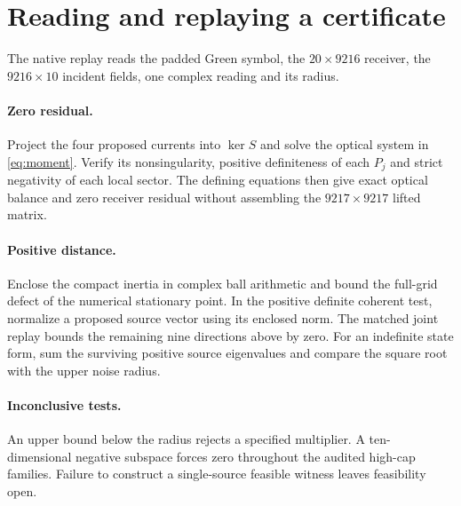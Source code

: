 \documentclass[anonymous,12pt]{iopjournal}
\theoremstyle{remark}\newtheorem{remark}[theorem]{Remark}
\numberwithin{equation}{section}
\begin{document}
\appendix
\section{Reading and replaying a certificate}\label{app:replay}

The native replay reads the padded Green symbol, the $20\times9216$ receiver, the $9216\times10$ incident fields, one complex reading and its radius.

\paragraph{Zero residual.}
Project the four proposed currents into $\ker S$ and solve the optical system in \eqref{eq:moment}. Verify its nonsingularity, positive definiteness of each $P_j$ and strict negativity of each local sector. The defining equations then give exact optical balance and zero receiver residual without assembling the $9217\times9217$ lifted matrix.

\paragraph{Positive distance.}
Enclose the compact inertia in complex ball arithmetic \cite{arb} and bound the full-grid defect of the numerical stationary point. In the positive definite coherent test, normalize a proposed source vector using its enclosed norm. The matched joint replay bounds the remaining nine directions above by zero. For an indefinite state form, sum the surviving positive source eigenvalues and compare the square root with the upper noise radius.

\paragraph{Inconclusive tests.}
An upper bound below the radius rejects a specified multiplier. A ten-dimensional negative subspace forces zero throughout the audited high-cap families. Failure to construct a single-source feasible witness leaves feasibility open.
\end{document}
